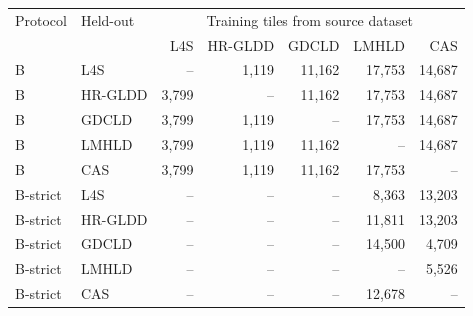 \begin{tabular}{llrrrrr}
\toprule
Protocol & Held-out & \multicolumn{5}{c}{Training tiles from source dataset} \\
 & & L4S & HR-GLDD & GDCLD & LMHLD & CAS \\
\midrule
B & L4S & -- & 1{,}119 & 11{,}162 & 17{,}753 & 14{,}687 \\
B & HR-GLDD & 3{,}799 & -- & 11{,}162 & 17{,}753 & 14{,}687 \\
B & GDCLD & 3{,}799 & 1{,}119 & -- & 17{,}753 & 14{,}687 \\
B & LMHLD & 3{,}799 & 1{,}119 & 11{,}162 & -- & 14{,}687 \\
B & CAS & 3{,}799 & 1{,}119 & 11{,}162 & 17{,}753 & -- \\
\midrule
B-strict & L4S & -- & -- & -- & 8{,}363 & 13{,}203 \\
B-strict & HR-GLDD & -- & -- & -- & 11{,}811 & 13{,}203 \\
B-strict & GDCLD & -- & -- & -- & 14{,}500 & 4{,}709 \\
B-strict & LMHLD & -- & -- & -- & -- & 5{,}526 \\
B-strict & CAS & -- & -- & -- & 12{,}678 & -- \\
\bottomrule
\end{tabular}
